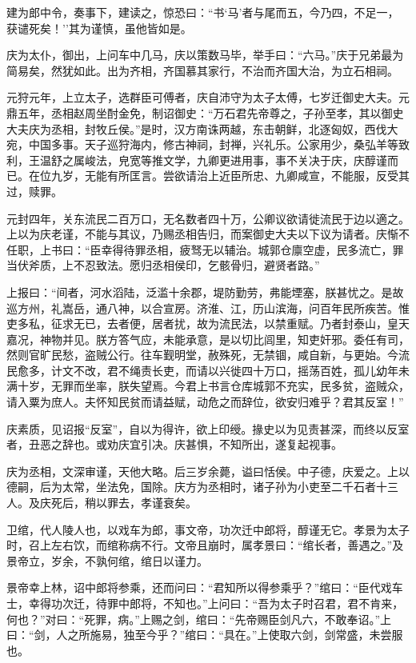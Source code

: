\documentclass[]{article}
\begin{document}
建为郎中令，奏事下，建读之，惊恐曰：``书`马'者与尾而五，今乃四，不足一，获谴死矣！''其为谨慎，虽他皆如是。

庆为太仆，御出，上问车中几马，庆以策数马毕，举手曰：``六马。''庆于兄弟最为简易矣，然犹如此。出为齐相，齐国慕其家行，不治而齐国大治，为立石相祠。

元狩元年，上立太子，选群臣可傅者，庆自沛守为太子太傅，七岁迁御史大夫。元鼎五年，丞相赵周坐酎金免，制诏御史：``万石君先帝尊之，子孙至孝，其以御史大夫庆为丞相，封牧丘侯。''是时，汉方南诛两越，东击朝鲜，北逐匈奴，西伐大宛，中国多事。天子巡狩海内，修古神祠，封禅，兴礼乐。公家用少，桑弘羊等致利，王温舒之属峻法，皃宽等推文学，九卿更进用事，事不关决于庆，庆醇谨而已。在位九岁，无能有所匡言。尝欲请治上近臣所忠、九卿咸宣，不能服，反受其过，赎罪。

元封四年，关东流民二百万口，无名数者四十万，公卿议欲请徙流民于边以適之。上以为庆老谨，不能与其议，乃赐丞相告归，而案御史大夫以下议为请者。庆惭不任职，上书曰：``臣幸得待罪丞相，疲驽无以辅治。城郭仓廪空虚，民多流亡，罪当伏斧质，上不忍致法。愿归丞相侯印，乞骸骨归，避贤者路。''

上报曰：``间者，河水滔陆，泛滥十余郡，堤防勤劳，弗能堙塞，朕甚忧之。是故巡方州，礼嵩岳，通八神，以合宣房。济淮、江，历山滨海，问百年民所疾苦。惟吏多私，征求无已，去者便，居者扰，故为流民法，以禁重赋。乃者封泰山，皇天嘉况，神物并见。朕方答气应，未能承意，是以切比闾里，知吏奸邪。委任有司，然则官旷民愁，盗贼公行。往车觐明堂，赦殊死，无禁锢，咸自新，与更始。今流民愈多，计文不改，君不绳责长吏，而请以兴徙四十万口，摇荡百姓，孤儿幼年未满十岁，无罪而坐率，朕失望焉。今君上书言仓库城郭不充实，民多贫，盗贼众，请入粟为庶人。夫怀知民贫而请益赋，动危之而辞位，欲安归难乎？君其反室！''

庆素质，见诏报``反室''，自以为得许，欲上印绶。掾史以为见责甚深，而终以反室者，丑恶之辞也。或劝庆宜引决。庆甚惧，不知所出，遂复起视事。

庆为丞相，文深审谨，天他大略。后三岁余薨，谥曰恬侯。中子德，庆爱之。上以德嗣，后为太常，坐法免，国除。庆方为丞相时，诸子孙为小吏至二千石者十三人。及庆死后，稍以罪去，孝谨衰矣。

卫绾，代人陵人也，以戏车为郎，事文帝，功次迁中郎将，醇谨无它。孝景为太子时，召上左右饮，而绾称病不行。文帝且崩时，属孝景曰：``绾长者，善遇之。''及景帝立，岁余，不孰何绾，绾日以谨力。

景帝幸上林，诏中郎将参乘，还而问曰：``君知所以得参乘乎？''绾曰：``臣代戏车士，幸得功次迁，待罪中郎将，不知也。''上问曰：``吾为太子时召君，君不肯来，何也？''对曰：``死罪，病。''上赐之剑，绾曰：``先帝赐臣剑凡六，不敢奉诏。''上曰：``剑，人之所施易，独至今乎？''绾曰：``具在。''上使取六剑，剑常盛，未尝服也。
\end{document}
